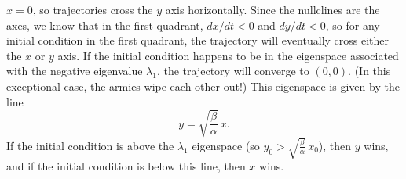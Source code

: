 \documentclass[reqno]{immbook}
\numberwithin{equation}{chapter}
\numberwithin{question}{section}
\numberwithin{theorem}{chapter}
\numberwithin{figure}{chapter}
\theoremstyle{definition}
\begin{document}
$x=0$, so trajectories cross the $y$ axis horizontally.
Since the nullclines are the axes, we know that in the first
quadrant, $dx/dt < 0$ and $dy/dt < 0$, so for any initial
condition in the first quadrant, the trajectory will eventually
cross either the $x$ or $y$ axis. If the initial condition
happens to be in the eigenspace associated with the negative
eigenvalue $\lambda_1$, the trajectory will converge to
$(0,0)$. (In this exceptional case, the armies wipe each
other out!)
This eigenspace is given by the line
\begin{equation}
  y = \sqrt{\frac{\beta}{\alpha}}\, x.
\end{equation}
If the initial condition is above the $\lambda_1$ eigenspace
(so $y_0 > \sqrt{\frac{\beta}{\alpha}}\, x_0$), then
$y$ wins, and if the initial condition is below this line,
then $x$ wins.
\end{document}
